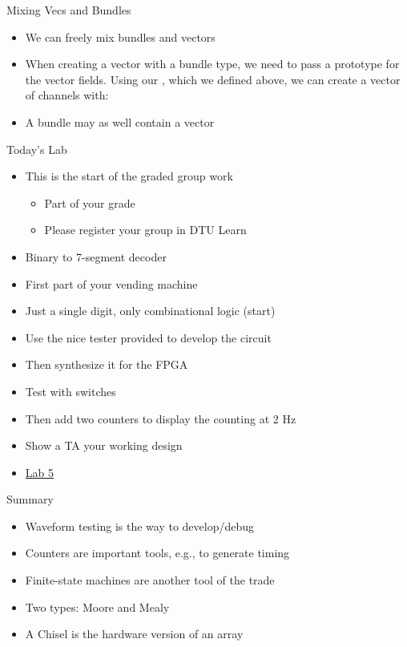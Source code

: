 \begin{frame}[fragile]{Mixing Vecs and Bundles}
\begin{itemize}
\item We can freely mix bundles and vectors
\item When creating a vector with a bundle
type, we need to pass a prototype for the vector fields. Using our
, which we defined above, we can create a vector of channels with:
\end{itemize}
\begin{itemize}
\item A bundle may as well contain a vector
\end{itemize}
\end{frame}

\begin{frame}[fragile]{Today's Lab}
\begin{itemize}
\item This is the start of the graded group work
\begin{itemize}
\item Part of your grade
\item Please register your group in DTU Learn
\end{itemize}
\item Binary to 7-segment decoder
\item First part of your vending machine
\item Just a single digit, only combinational logic (start)
\item Use the nice tester provided to develop the circuit
\item Then synthesize it for the FPGA
\item Test with switches
\item Then add two counters to display the counting at 2 Hz
\item Show a TA your working design
\item \href{https://github.com/schoeberl/chisel-lab/tree/master/lab5}{Lab 5}
\end{itemize}
\end{frame}



\begin{frame}[fragile]{Summary}
\begin{itemize}
\item Waveform testing is the way to develop/debug
\item Counters are important tools, e.g., to generate timing
\item Finite-state machines are another tool of the trade
\item Two types: Moore and Mealy
\item A Chisel  is the hardware version of an array
\end{itemize}
\end{frame}




